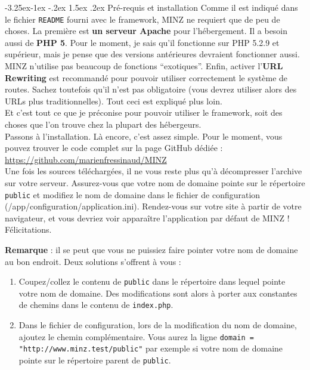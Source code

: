 \documentclass[a4paper,11pt]{article}
\makeatletter
\renewcommand{\subsection}{\@startsection{subsection}{2}{\z@}%
             {-3.25ex\@plus -1ex \@minus -.2ex}%
             {1.5ex \@plus .2ex}%
             {\color{bleuFonce}\normalfont\large\bfseries}}
\makeatother
\begin{document}
\subsection{Pré-requis et installation}
Comme il est indiqué dans le fichier \texttt{README} fourni avec le framework, MINZ ne requiert que de peu de choses. La première est \textbf{un serveur Apache} pour l'hébergement. Il a besoin aussi de \textbf{PHP 5}. Pour le moment, je sais qu'il fonctionne sur PHP 5.2.9 et supérieur, mais je pense que des versions antérieures devraient fonctionner aussi. MINZ n'utilise pas beaucoup de fonctions ``exotiques''. Enfin, activer l'\textbf{URL Rewriting} est recommandé pour pouvoir utiliser correctement le système de routes. Sachez toutefois qu'il n'est pas obligatoire (vous devrez utiliser alors des URLs plus traditionnelles). Tout ceci est expliqué plus loin.\\
Et c'est tout ce que je préconise pour pouvoir utiliser le framework, soit des choses que l'on trouve chez la plupart des hébergeurs.\\

Passons à l'installation. Là encore, c'est assez simple. Pour le moment, vous pouvez trouver le code complet sur la page GitHub dédiée :\\ \url{https://github.com/marienfressinaud/MINZ}\\

Une fois les sources téléchargées, il ne vous reste plus qu'à décompresser l'archive sur votre serveur. Assurez-vous que votre nom de domaine pointe sur le répertoire \texttt{public} et modifiez le nom de domaine dans le fichier de configuration (/app/configuration/application.ini). Rendez-vous sur votre site à partir de votre navigateur, et vous devriez voir apparaître l'application par défaut de MINZ ! Félicitations.\\

\textcolor{grisFonce}{\textbf{Remarque} : il se peut que vous ne puissiez faire pointer votre nom de domaine au bon endroit. Deux solutions s'offrent à vous :
\begin{enumerate}
  \item Coupez/collez le contenu de \texttt{public} dans le répertoire dans lequel pointe votre nom de domaine. Des modifications sont alors à porter aux constantes de chemins dans le contenu de \texttt{index.php}.
  \item Dans le fichier de configuration, lors de la modification du nom de domaine, ajoutez le chemin complémentaire. Vous aurez la ligne \texttt{domain = "http://www.minz.test/public"} par exemple si votre nom de domaine pointe sur le répertoire parent de \texttt{public}.
\end{enumerate}
}
\end{document}
